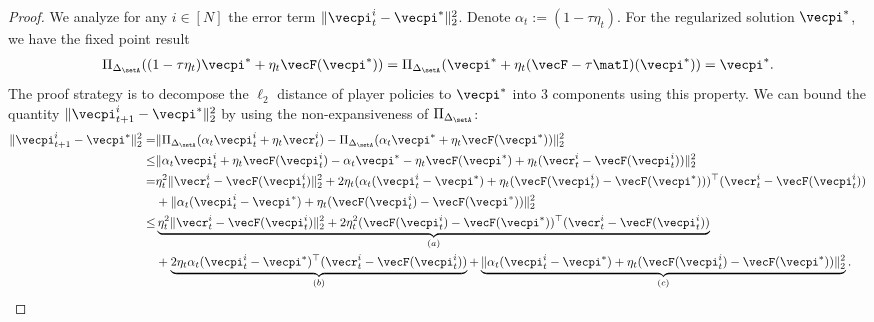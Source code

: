 \begin{proof}
We analyze for any $i\in[N]$ the error term $\| \vecpi_t^i - \vecpi^*\|_2^2$.
Denote $\alpha_t := (1 - \tau \eta_t)$.
For the regularized solution $\vecpi^*$, we have the fixed point result
\begin{align*}
    \Pi_{\Delta_{\setA}} ((1 - \tau \eta_t) \vecpi^* + \eta_t \vecF(\vecpi^*)) = \Pi_{\Delta_{\setA}} (\vecpi^* + \eta_t (\vecF - \tau \matI)(\vecpi^*)) = \vecpi^*.
\end{align*}
The proof strategy is to decompose the $\ell_2$ distance of player policies to $\vecpi^*$ into 3 components using this property.
We can bound the quantity $\| \vecpi_{t+1}^i - \vecpi^*\|_2^2$ by using the non-expansiveness of $\Pi_{\Delta_{\setA}}$:
\begin{align}
    \| \vecpi_{t+1}^i - \vecpi^*\|_2^2 = &\| \Pi_{\Delta_{\setA}}(\alpha_t \vecpi^i_t + \eta_t \vecr_t^i) - \Pi_{\Delta_{\setA}} (\alpha_t \vecpi^* + \eta_t \vecF(\vecpi^*)) \|_2^2 \notag \\
        \leq &\| \alpha_t \vecpi_t^i + \eta_t \vecF(\vecpi_t^i) - \alpha_t \vecpi^* - \eta_t \vecF(\vecpi^*) + \eta_t (\vecr_t^i - \vecF(\vecpi_t^i) )\|_2^2 \notag \\
        = & \eta_t^2\| \vecr_t^i - \vecF(\vecpi_t^i) \|_2^2 + 2\eta_t (\alpha_t (\vecpi_t^i - \vecpi^*) + \eta_t (\vecF(\vecpi_t^i) - \vecF(\vecpi^*)) )^\top (\vecr_t^i - \vecF(\vecpi_t^i)) \notag \\
         & + \|\alpha_t (\vecpi_t^i - \vecpi^*) + \eta_t (\vecF(\vecpi_t^i) - \vecF(\vecpi^*))\|_2^2 \notag \\
         \leq & \underbrace{\eta_t^2\| \vecr_t^i - \vecF(\vecpi_t^i) \|_2^2 + 2\eta_t^2 (\vecF(\vecpi_t^i) - \vecF(\vecpi^*))^\top (\vecr_t^i - \vecF(\vecpi_t^i))}_{(a)} \notag \\
            &+ \underbrace{2\eta_t\alpha_t (\vecpi_t^i - \vecpi^*)^\top (\vecr_t^i - \vecF(\vecpi_t^i))}_{(b)} + \underbrace{\|\alpha_t (\vecpi_t^i - \vecpi^*) + \eta_t (\vecF(\vecpi_t^i) - \vecF(\vecpi^*))\|_2^2 }_{(c)}. \label{ineq:decomp_abc_full_recur}
\end{align}


\end{proof}
